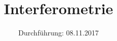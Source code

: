 

\subject{V64}
\title{Interferometrie}
\date{
  Durchführung: 08.11.2017
  \hspace{3em}
}



\maketitle
\thispagestyle{empty}
\tableofcontents
\newpage




%


\nocite{*}
\printbibliography

%


